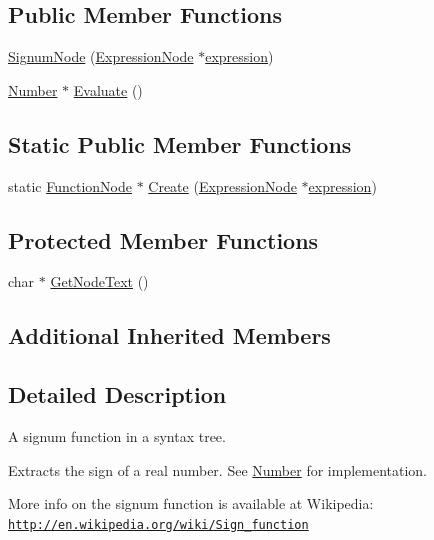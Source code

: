 \subsection*{Public Member Functions}
\begin{DoxyCompactItemize}
\item 
\hyperlink{classSignumNode_ab32cce0dffab55958f04a0e1c90c70e5}{Signum\+Node} (\hyperlink{classExpressionNode}{Expression\+Node} $\ast$\hyperlink{classFunctionNode_ad7577b179a1937aaf8a0058bb5b546dc}{expression})
\item 
\hyperlink{structNumber}{Number} $\ast$ \hyperlink{classSignumNode_a4d36a858fda9c051ecddf975bc94a62e}{Evaluate} ()
\end{DoxyCompactItemize}
\subsection*{Static Public Member Functions}
\begin{DoxyCompactItemize}
\item 
static \hyperlink{classFunctionNode}{Function\+Node} $\ast$ \hyperlink{classSignumNode_a7cd36999a3e5fc9ed7466632388044f1}{Create} (\hyperlink{classExpressionNode}{Expression\+Node} $\ast$\hyperlink{classFunctionNode_ad7577b179a1937aaf8a0058bb5b546dc}{expression})
\end{DoxyCompactItemize}
\subsection*{Protected Member Functions}
\begin{DoxyCompactItemize}
\item 
char $\ast$ \hyperlink{classSignumNode_a77140b990e0c3e0f75d074d4405a4e4f}{Get\+Node\+Text} ()
\end{DoxyCompactItemize}
\subsection*{Additional Inherited Members}


\subsection{Detailed Description}
A signum function in a syntax tree. 

Extracts the sign of a real number. See \hyperlink{structNumber}{Number} for implementation.

More info on the signum function is available at Wikipedia\+: \href{http://en.wikipedia.org/wiki/Sign_function}{\tt http\+://en.\+wikipedia.\+org/wiki/\+Sign\+\_\+function} 

